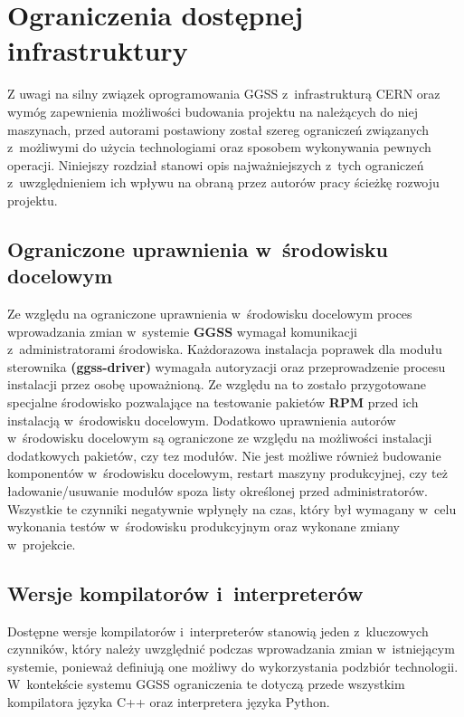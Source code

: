 
\chapter{Ograniczenia dostępnej infrastruktury}
\label{cha:ogra}
Z uwagi na silny związek oprogramowania GGSS z~infrastrukturą CERN oraz wymóg zapewnienia możliwości budowania projektu na należących do niej maszynach, przed autorami postawiony został szereg ograniczeń związanych z~możliwymi do użycia technologiami oraz sposobem wykonywania pewnych operacji. Niniejszy rozdział stanowi opis najważniejszych z~tych ograniczeń z~uwzględnieniem ich wpływu na obraną przez autorów pracy ścieżkę rozwoju projektu.


\section{Ograniczone uprawnienia w~środowisku docelowym}
Ze względu na ograniczone uprawnienia w~środowisku docelowym proces wprowadzania zmian w~systemie \textbf{GGSS} wymagał komunikacji z~administratorami środowiska. Każdorazowa instalacja poprawek dla modułu sterownika \textbf{(ggss-driver)} wymagała autoryzacji oraz przeprowadzenie procesu instalacji przez osobę upoważnioną. Ze względu na to zostało przygotowane specjalne środowisko pozwalające na testowanie pakietów \textbf{RPM} przed ich instalacją w~środowisku docelowym. Dodatkowo uprawnienia autorów w~środowisku docelowym są ograniczone ze względu na możliwości instalacji dodatkowych pakietów, czy tez modułów. Nie jest możliwe również budowanie komponentów w~środowisku docelowym, restart maszyny produkcyjnej, czy też ładowanie/usuwanie modułów spoza listy określonej przed administratorów. Wszystkie te czynniki negatywnie wpłynęły na czas, który był wymagany w~celu wykonania testów w~środowisku produkcyjnym oraz wykonane zmiany w~projekcie.


\section{Wersje kompilatorów i~interpreterów}
Dostępne wersje kompilatorów i~interpreterów stanowią jeden z~kluczowych czynników, który należy uwzględnić podczas wprowadzania zmian w~istniejącym systemie, ponieważ definiują one możliwy do wykorzystania podzbiór technologii. W~kontekście systemu GGSS ograniczenia te dotyczą przede wszystkim kompilatora języka C++ oraz interpretera języka Python. \par

